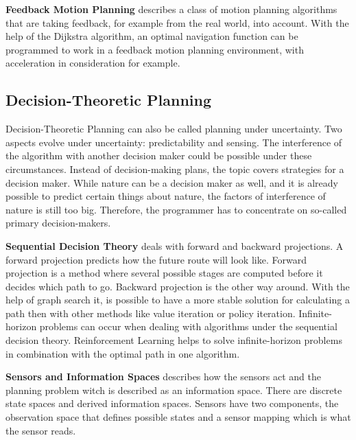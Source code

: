 \textbf{Feedback Motion Planning} describes a class of motion planning algorithms that are taking feedback, for example from the real world, into account. With the help of the Dijkstra algorithm, an optimal navigation function can be programmed to work in a feedback motion planning environment, with acceleration in consideration for example. \cite{planning_algorithms_steven_m_lavalle}

\subsection{Decision-Theoretic Planning} \label{sec:Decision-Theoretic Planning}

Decision-Theoretic Planning can also be called planning under uncertainty. Two aspects evolve under uncertainty: predictability and sensing. The interference of the algorithm with another decision maker could be possible under these circumstances. Instead of decision-making plans, the topic covers strategies for a decision maker. While nature can be a decision maker as well, and it is already possible to predict certain things about nature, the factors of interference of nature is still too big. Therefore, the programmer has to concentrate on so-called primary decision-makers. \cite{planning_algorithms_steven_m_lavalle}

\textbf{Sequential Decision Theory} deals with forward and backward projections. A forward projection predicts how the future route will look like. Forward projection is a method where several possible stages are computed before it decides which path to go. Backward projection is the other way around. With the help of graph search it, is possible to have a more stable solution for calculating a path then with other methods like value iteration or policy iteration. Infinite-horizon problems can occur when dealing with algorithms under the sequential decision theory. Reinforcement Learning helps to solve infinite-horizon problems in combination with the optimal path in one algorithm. \cite{planning_algorithms_steven_m_lavalle}

\textbf{Sensors and Information Spaces} describes how the sensors act and the planning problem witch is described as an information space. There are discrete state spaces and derived information spaces. Sensors have two components, the observation space that defines possible states and a sensor mapping which is what the sensor reads. \cite{planning_algorithms_steven_m_lavalle}


